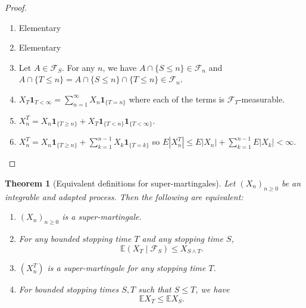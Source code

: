 \documentclass[parskip=full]{article}
\newtheorem{theorem}{Theorem}[section]
\theoremstyle{definition}
\newcommand{\1}{\mathbbm{1}}
\newcommand{\E}{\mathbb{E}}
\begin{document}
\begin{proof}
  $ $
  \begin{enumerate}
    \item Elementary
    \item Elementary
    \item Let $A \in \mathcal{F}_S$. For any $n$, we have $A \cap \{S \leq n\} \in \mathcal{F}_n$ and $A \cap \{T \leq n\} = A \cap \{S \leq n\} \cap \{T \leq n\} \in \mathcal{F}_n$.
    \item $X_T \mathbf{1}_{T < \infty} = \sum_{n=1}^\infty X_n \mathbf{1}_{\{T = n\}}$ where each of the terms is $\mathcal{F}_T$-measurable.
    \item $X^T_n = X_n \mathbf{1}_{\{T \geq n\}} + X_T \mathbf{1}_{\{T < n\}} \mathbf{1}_{\{T < \infty\}}$.
    \item $X^T_n = X_n \mathbf{1}_{\{T \geq n\}} + \sum _{k=1}^{n-1} X_k \mathbf{1}_{\{T = k\}}$ so $E |X^T_n| \leq E|X_n| + \sum_{k=1}^{n-1} E|X_k| < \infty$.
  \end{enumerate}
\end{proof}

\begin{theorem}[Equivalent definitions for super-martingales]
  Let $(X_n)_{n \geq 0}$ be an integrable and adapted process. Then the following are equivalent:
  \begin{enumerate}
    \item $(X_n)_{n \geq 0}$ is a super-martingale.
    \item For any bounded stopping time $T$ and any stopping time $S$,
          \[
            \E(X_T \mid \mathcal{F}_S) \leq X_{S \wedge T}.
          \]
    \item $(X_n^T)$ is a super-martingale for any stopping time $T$.
    \item \label{super martingale: monotone} For bounded stopping times $S, T$ such that $S \leq T$, we have
          \[
            \E X_T \leq \E X_S.
          \]
  \end{enumerate}
\end{theorem}
\end{document}

